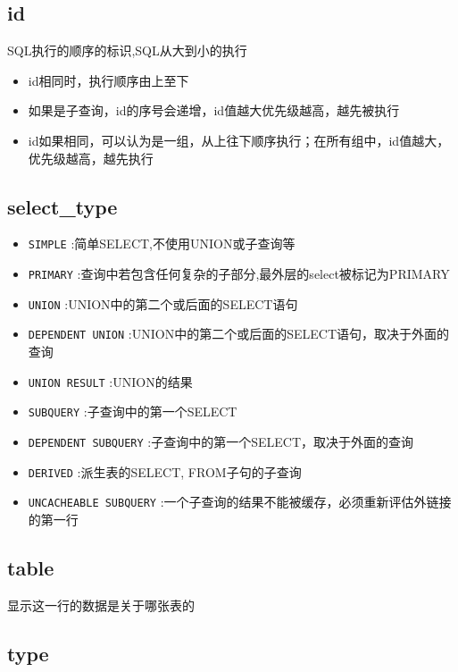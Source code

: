 \documentclass[UTF8,a4paper,12pt]{ctexbook}
\begin{document}
		\subsection{id}
			SQL执行的顺序的标识,SQL从大到小的执行
			\begin{itemize}
				\item id相同时，执行顺序由上至下
				\item 如果是子查询，id的序号会递增，id值越大优先级越高，越先被执行
				\item id如果相同，可以认为是一组，从上往下顺序执行；在所有组中，id值越大，优先级越高，越先执行
			\end{itemize}
			
		\subsection{select\_type}
			\begin{itemize}
				\item \verb|SIMPLE|  :简单SELECT,不使用UNION或子查询等
				\item \verb|PRIMARY| :查询中若包含任何复杂的子部分,最外层的select被标记为PRIMARY
				\item \verb|UNION| :UNION中的第二个或后面的SELECT语句
				\item \verb|DEPENDENT UNION| :UNION中的第二个或后面的SELECT语句，取决于外面的查询
				\item \verb|UNION RESULT| :UNION的结果
				\item \verb|SUBQUERY| :子查询中的第一个SELECT
				\item \verb|DEPENDENT SUBQUERY| :子查询中的第一个SELECT，取决于外面的查询
				\item \verb|DERIVED| :派生表的SELECT, FROM子句的子查询
				\item \verb|UNCACHEABLE SUBQUERY| :一个子查询的结果不能被缓存，必须重新评估外链接的第一行
			\end{itemize}
			
		\subsection{table}	
			显示这一行的数据是关于哪张表的
			
		\subsection{type}
			
\end{document}
